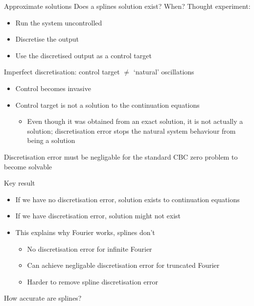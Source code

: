 \documentclass[presentation]{beamer}
\begin{document}
\begin{frame}[label={sec:org8cfbd45}]{Approximate solutions}
Does a splines solution exist? When? Thought experiment:
\begin{itemize}
\item Run the system uncontrolled
\item Discretise the output
\item Use the discretised output as a control target
\end{itemize}
\vfill
Imperfect discretisation: control target \(\neq\) `natural' oscillations
\begin{itemize}
\item Control becomes invasive
\item Control target is not a solution to the continuation equations 
\begin{itemize}
\item Even though it was obtained from an exact solution, it is not actually a solution; discretisation error stops the natural system behaviour from being a solution
\end{itemize}
\end{itemize}
\vfill
\alert{Discretisation error must be negligable for the standard CBC zero problem to become solvable}
\end{frame}

\begin{frame}[label={sec:org2388164}]{Key result}
\begin{itemize}
\item If we have no discretisation error, solution exists to continuation equations
\end{itemize}
\vfill
\begin{itemize}
\item If we have discretisation error, solution might not exist
\end{itemize}
\vfill
\begin{itemize}
\item This explains why Fourier works, splines don't
\begin{itemize}
\item No discretisation error for infinite Fourier
\item Can achieve negligable discretisation error for truncated Fourier
\item Harder to remove spline discretisation error
\end{itemize}
\end{itemize}
\vfill
How accurate are splines?
\end{frame}
\end{document}
